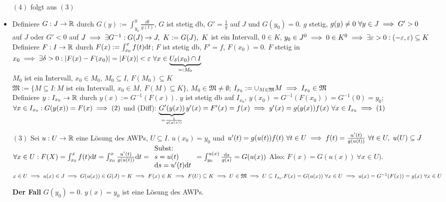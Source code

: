 \documentclass[a4paper,twoside,DIV15,BCOR12mm]{scrbook}
\begin{document}
\begin{beweis}
\begin{itemize}
\item[$(4)$] folgt aus $(3)$
\item Definiere $G:J\to \mathbb{R}$ durch $G(y):=\int_{y_0}^y \frac{dt}{g(t)}$, $G$ ist stetig db, $G'=\frac{1}{g}$ auf $J$ und $G(y_0)=0$. $g$ stetig, $g(y)\ne 0\ \forall y\in J \implies G'>0$ auf $J$ oder $G'<0$ auf $J \folgt \exists G^{-1}:G(J)\to J,\ K:=G(J),\ K$ ist ein Intervall, $0\in K$, $y_0 \in J^0 \implies 0\in K^0\implies \exists \varepsilon >0:(-\varepsilon,\varepsilon)\subseteq K$
Definiere $F:I\to\mathbb{R}$ durch $F(x):=\int_{x_0}^xf(t)\mathrm{d} t$; $F$ ist stetig db, $F'=f$, $F(x_0)=0$. $F$ stetig in $x_0\implies \exists \delta >0: |F(x)-F(x_0)|=|F(x)| < \varepsilon\ \forall x\in \underbrace{U_\delta (x_0) \cap I}_{=:M_0}$\\
$M_0$ ist ein Intervall, $x_0\in M_0$, $M_0 \subseteq I$, $F(M_0)\subseteq K$ \\
$\mathfrak{M}:=\{M\subseteq I : M \text{ ist ein Intervall, } x_0\in M,\ F(M)\subseteq K\}$, $M_0\in \mathfrak{M} \ne \emptyset$; $I_{x_0}:=\cup_{M\in \mathfrak{M}} M \implies I_{x_0} \in \mathfrak{M}$\\
Definiere $y:I_{x_0}\to\mathbb{R}$ durch $y(x):=G^{-1}(F(x))$. $y$ ist stetig db auf $I_{x_0}$, $y(x_0)=G^{-1}(F(x_0))=G^{-1}(0)=y_0$; $\forall x \in I_{x_0}: G(y(x))=F(x) \implies (2)$ und (Diff): $\underbrace{G'(y(x))}_{=\frac{1}{g(y(x))}}y'(x)=F'(x)=f(x)\implies y'(x)=g(y(x))f(x)\ \forall x\in I_{x_0} \implies (1)$
\item[$(3)$] Sei $u:U\to\mathbb{R}$ eine Lösung des AWPs, $U\subseteq I$. $u(x_0)=y_0$ und $u'(t)=g(u(t))f(t)\ \forall t\in U \implies f(t)=\frac{u'(t)}{g(u(t))}\ \forall t\in U,\ u(U)\subseteq J$\\
$\forall x\in U: F(X)=\int_{x_0}^x f(t)\mathrm{d} t = \int_{x_0}^x\frac{u'(t)}{g(u(t))}\mathrm{d} t=\begin{array}{l} \text{Subst:}\\s=u(t)\\\mathrm{d} s=u'(t)\mathrm{d} t\end{array}=\int_{y_0}^{u(x)}\frac{\mathrm{d} s}{g(s)}=G(u(x))$ Also: $F(x)=G(u(x))\ \forall x\in U)$.
$x \in U \implies u(x)\in J\implies G(u(x))\in G(J)=K\implies F(x)\in K\implies F(U)\subseteq K\implies U\in \mathfrak{M} \implies U\subseteq I_{x_0}.\\
F(x)=G(u(x))\ \forall x\in U \implies u(x)=G^{-1}(F(x))=y(x)\ \forall x\in U$

\textbf{Der Fall} $G(y_0) = 0$. $y(x) = y_0$ ist eine Lösung des AWPs.
\end{itemize}
\end{beweis}
\end{document}
